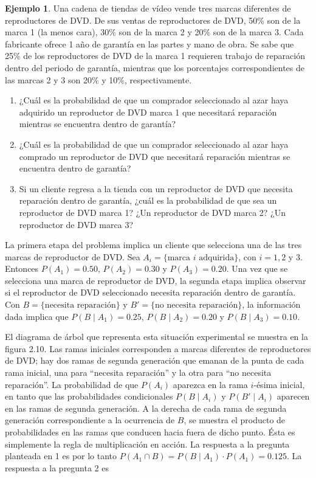 \documentclass[
  11pt,
]{book}
\theoremstyle{definition}
\theoremstyle{definition}
\newtheorem{example}{Ejemplo}[chapter]
\theoremstyle{definition}
\theoremstyle{definition}
\theoremstyle{remark}
\begin{document}
\begin{example}
Una cadena de tiendas de vídeo vende tres marcas diferentes de reproductores de DVD. De sus ventas de reproductores de DVD, 50\% son de la marca 1 (la menos cara), 30\% son de la marca 2 y 20\% son de la marca 3. Cada fabricante ofrece 1 año de garantía en las partes y mano de obra. Se sabe que 25\% de los reproductores de DVD de la marca 1 requieren trabajo de reparación dentro del periodo de garantía, mientras que los porcentajes correspondientes de las marcas 2 y 3 son 20\% y 10\%, respectivamente.

\begin{enumerate}
\def\labelenumi{\arabic{enumi}.}
\item
  ¿Cuál es la probabilidad de que un comprador seleccionado al azar haya adquirido un reproductor de DVD marca 1 que necesitará reparación mientras se encuentra dentro de garantía?
\item
  ¿Cuál es la probabilidad de que un comprador seleccionado al azar haya comprado un reproductor de DVD que necesitará reparación mientras se encuentra dentro de garantía?
\item
  Si un cliente regresa a la tienda con un reproductor de DVD que necesita reparación dentro de garantía, ¿cuál es la probabilidad de que sea un reproductor de DVD marca 1? ¿Un reproductor de DVD marca 2? ¿Un reproductor de DVD marca 3?
\end{enumerate}

La primera etapa del problema implica un cliente que selecciona una de las tres marcas de reproductor de DVD. Sea \(A_i = \{ \text{marca } i \text{ adquirida} \}\), con \(i = 1, 2\) y \(3\). Entonces \(P(A_1) = 0.50\), \(P(A_2) = 0.30\) y \(P(A_3) = 0.20\). Una vez que se selecciona una marca de reproductor de DVD, la segunda etapa implica observar si el reproductor de DVD seleccionado necesita reparación dentro de garantía. Con \(B = \{ \text{necesita reparación} \}\) y \(B' = \{ \text{no necesita reparación} \}\), la información dada implica que \(P(B \mid A_1) = 0.25\), \(P(B \mid A_2) = 0.20\) y \(P(B \mid A_3) = 0.10\).

El diagrama de árbol que representa esta situación experimental se muestra en la figura 2.10. Las ramas iniciales corresponden a marcas diferentes de reproductores de DVD; hay dos ramas de segunda generación que emanan de la punta de cada rama inicial, una para ``necesita reparación'' y la otra para ``no necesita reparación''. La probabilidad de que \(P(A_i)\) aparezca en la rama \(i\)-ésima inicial, en tanto que las probabilidades condicionales \(P(B \mid A_i)\) y \(P(B' \mid A_i)\) aparecen en las ramas de segunda generación. A la derecha de cada rama de segunda generación correspondiente a la ocurrencia de \(B\), se muestra el producto de probabilidades en las ramas que conducen hacia fuera de dicho punto. Ésta es simplemente la regla de multiplicación en acción. La respuesta a la pregunta planteada en 1 es por lo tanto \(P(A_1 \cap B) = P(B \mid A_1) \cdot P(A_1) = 0.125\). La respuesta a la pregunta 2 es


\end{example}
\end{document}
